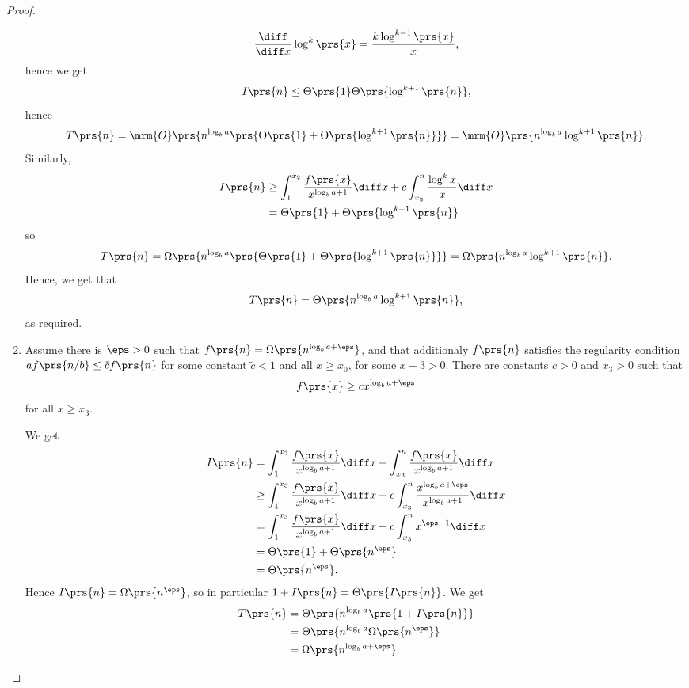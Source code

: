 \documentclass[oneside]{scrbook}
\theoremstyle{definition}
\begin{document}
\begin{exercise}
\begin{proof}
\begin{enumerate}
\begin{align*}
\frac{\diff}{\diff x} \log^k\prs{x} = \frac{k \log^{k-1}\prs{x}}{x} \text{,}
\end{align*}
hence we get
\begin{align*}
I\prs{n} \leq \Theta\prs{1} \Theta\prs{\log^{k+1}\prs{n}} \text{,}
\end{align*}
hence
\begin{align*}
T\prs{n} = \mrm{O}\prs{n^{\log_b a} \prs{\Theta\prs{1} + \Theta\prs{\log^{k+1}\prs{n}}}} = \mrm{O}\prs{n^{\log_b a} \log^{k+1}\prs{n}} \text{.}
\end{align*}
Similarly,
\begin{align*}
I\prs{n} &\geq \int_1^{x_2} \frac{f\prs{x}}{x^{\log_b a + 1}} \diff x + c \int_{x_2}^n \frac{\log^k x}{x} \diff x
\\&= \Theta\prs{1} + \Theta\prs{\log^{k+1}\prs{n}}
\end{align*}
so
\begin{align*}
T\prs{n} = \Omega\prs{n^{\log_b a} \prs{\Theta\prs{1} + \Theta\prs{\log^{k+1}\prs{n}}}} = \Omega\prs{n^{\log_b a} \log^{k+1}\prs{n}} \text{.}
\end{align*}
Hence, we get that
\begin{align*}
T\prs{n} = \Theta\prs{n^{\log_b a} \log^{k+1}\prs{n}} \text{,}
\end{align*}
as required.

\item
Assume there is $\eps > 0$ such that $f\prs{n} = \Omega\prs{n^{\log_b a + \eps}}$, and that additionaly $f\prs{n}$ satisfies the regularity condition $a f\prs{n/b} \leq \tilde{c} f\prs{n}$ for some constant $\tilde{c} < 1$ and all $x \geq x_0$, for some $x+3 > 0$.
There are constants $c > 0$ and $x_3 > 0$ such that
\begin{align*}
	f\prs{x} \geq c x^{\log_b a + \eps}
\end{align*}
for all $x \geq x_3$.

We get
\begin{align*}
I\prs{n} &= \int_1^{x_3} \frac{f\prs{x}}{x^{\log_b a + 1}} \diff x + \int_{x_3}^n \frac{f\prs{x}}{x^{\log_b a + 1}} \diff x
\\&\geq \int_1^{x_3} \frac{f\prs{x}}{x^{\log_b a + 1}} \diff x + c\int_{x_3}^n \frac{x^{\log_b a + \eps}}{x^{\log_b a + 1}} \diff x
\\&= \int_1^{x_3} \frac{f\prs{x}}{x^{\log_b a + 1}} \diff x + c\int_{x_3}^n x^{\eps - 1} \diff x
\\&= \Theta\prs{1} + \Theta\prs{n^{\eps}}
\\&= \Theta\prs{n^\eps} \text{.}
\end{align*}
Hence $I\prs{n} = \Omega\prs{n^\eps}$, so in particular $1 + I\prs{n} = \Theta\prs{I\prs{n}}$. We get
\begin{align*}
T\prs{n} &= \Theta\prs{n^{\log_b a}\prs{1 + I\prs{n}}}
\\&= \Theta\prs{n^{\log_b a} \Omega\prs{n^\eps}}
\\&= \Omega\prs{n^{\log_b a + \eps}} \text{.}
\end{align*}


\end{enumerate}
\end{proof}
\end{exercise}
\end{document}
